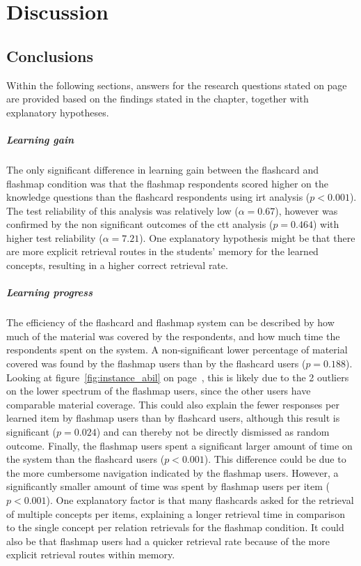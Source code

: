 \chapter{Discussion}
\label{ch:discussion}

\section{Conclusions}

Within the following sections, answers for the research questions stated on page~\pageref{sec:intro_evaluation} are provided based on the findings stated in the  chapter, together with explanatory hypotheses.

\paragraph{Learning gain} The only significant difference in learning gain between the flashcard and flashmap condition was that the flashmap respondents scored higher on the knowledge questions than the flashcard respondents using irt analysis ($p < 0.001$). The test reliability of this analysis was relatively low ($\alpha=0.67$), however was confirmed by the non significant outcomes of the ctt analysis ($p=0.464$) with higher test reliability ($\alpha=7.21$). One explanatory hypothesis might be that there are more explicit retrieval routes in the students' memory for the learned concepts, resulting in a higher correct retrieval rate.

\paragraph{Learning progress} The efficiency of the flashcard and flashmap system can be described by how much of the material was covered by the respondents, and how much time the respondents spent on the system. A non-significant lower percentage of material covered was found by the flashmap users than by the flashcard users ($p=0.188$). Looking at figure~\ref{fig:instance_abil} on page~\pageref{fig:instance_abil}, this is likely due to the 2 outliers on the lower spectrum of the flashmap users, since the other users have comparable material coverage. This could also explain the fewer responses per learned item by flashmap users than by flashcard users, although this result is significant ($p=0.024$) and can thereby not be directly dismissed as random outcome. Finally, the flashmap users spent a significant larger amount of time on the system than the flashcard users ($p<0.001$). This difference could be due to the more cumbersome navigation indicated by the flashmap users. However, a significantly smaller amount of time was spent by flashmap users per item ($p<0.001$). One explanatory factor is that many flashcards asked for the retrieval of multiple concepts per items, explaining a longer retrieval time in comparison to the single concept per relation retrievals for the flashmap condition. It could also be that flashmap users had a quicker retrieval rate because of the more explicit retrieval routes within memory.

